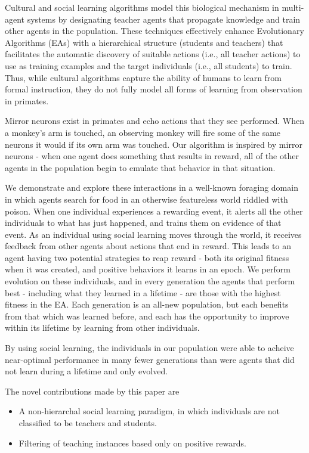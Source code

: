 \documentclass{acm_proc_article-sp}
\begin{document}
Cultural and social learning algorithms \cite{reynolds1994introduction} model this biological mechanism in multi-agent systems by designating teacher agents that propagate knowledge and train other agents in the population. These techniques effectively enhance Evolutionary Algorithms (EAs) with a hierarchical structure (students and teachers) that facilitates the automatic discovery of suitable actions (i.e., all teacher actions) to use as training examples and the target individuals (i.e., all students) to train. Thus, while cultural algorithms capture the ability of humans to learn from formal instruction, they do not fully model all forms of learning from observation in primates.

Mirror neurons exist in primates and echo actions that they see performed. When a monkey's arm is touched, an observing monkey will fire some of the same neurons it would if its own arm was touched. \cite{gallese-98}  Our algorithm is inspired by mirror neurons - when one agent does something that results in reward, all of the other agents in the population begin to emulate that behavior in that situation.
    
We demonstrate and explore these interactions in a well-known foraging domain in which agents search for food in an otherwise featureless world riddled with poison.  When one individual experiences a rewarding event, it alerts all the other individuals to what has just happened, and trains them on evidence of that event.
As an individual using social learning moves through the world, it receives feedback from other agents about actions that end in reward.  This leads to an agent having two potential strategies to reap reward - both its original fitness when it was created, and positive behaviors it learns in an epoch.
We perform evolution on these individuals, and in every generation the agents that perform best - including what they learned in a lifetime - are those with the highest fitness in the EA.  
Each generation is an all-new population, but each benefits from that which was learned before, and each has the opportunity to improve within its lifetime by learning from other individuals.
    
By using social learning, the individuals in our population were able to acheive near-optimal performance in many fewer generations than were agents that did not learn during a lifetime and only evolved.

The novel contributions made by this paper are 
\begin{itemize}
\item A non-hierarchal social learning paradigm, in which individuals are not classified to be teachers and students.
\item Filtering of teaching instances based only on positive rewards. 
\end{itemize}
 
\end{document}
